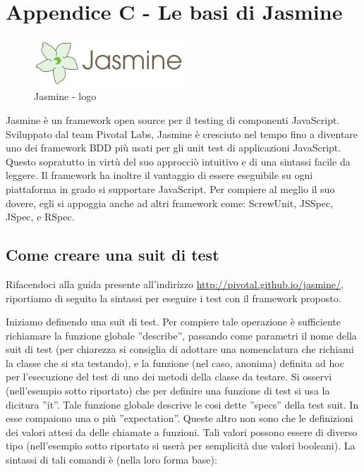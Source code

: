 \documentclass[10pt,a4paper,onecolumn]{article}
\begin{document}
\clearpage

\section{Appendice C - Le basi di Jasmine}

\begin{figure}[h]
	\centering
	\includegraphics[width=0.5\textwidth]{img/jasmine}
	\caption{Jasmine - logo}						
	\label{fig:jasmine logo}
\end{figure}

Jasmine è un framework open source per il testing di componenti JavaScript. Sviluppato dal team Pivotal Labs, Jasmine è cresciuto nel tempo fino a diventare uno dei framework BDD più usati per gli unit test di applicazioni JavaScript. Questo sopratutto in virtù del suo approcciò intuitivo e  di una sintassi facile da leggere. Il framework ha inoltre il vantaggio di essere eseguibile su ogni piattaforma in grado si supportare JavaScript. Per compiere al meglio il suo dovere, egli si appoggia anche ad altri framework come: ScrewUnit, JSSpec, JSpec, e RSpec.

\subsection{Come creare una suit di test}

Rifacendoci alla guida presente all'indirizzo \url{http://pivotal.github.io/jasmine/}, riportiamo di seguito la sintassi per eseguire i test con il framework proposto. 

Iniziamo definendo una suit di test. Per compiere tale operazione è sufficiente richiamare la funzione globale ''describe'', passando come parametri il nome della suit di test (per chiarezza si consiglia di adottare una nomenclatura che richiami la classe che si sta testando), e la funzione (nel caso, anonima) definita ad hoc per l'esecuzione del test di uno dei metodi della classe da testare. Si osservi (nell'esempio sotto riportato) che per definire una funzione di test si usa la dicitura ''it''. Tale funzione globale descrive le cosi dette ''specs'' della test suit. In esse compaiono una o più ''expectation''. Queste altro non sono che le definizioni dei valori attesi da delle chiamate a funzioni. Tali valori possono essere di diverso tipo (nell'esempio sotto riportato si userà per semplicità due valori booleani). La sintassi di tali comandi è (nella loro forma base): \\
\end{document}
